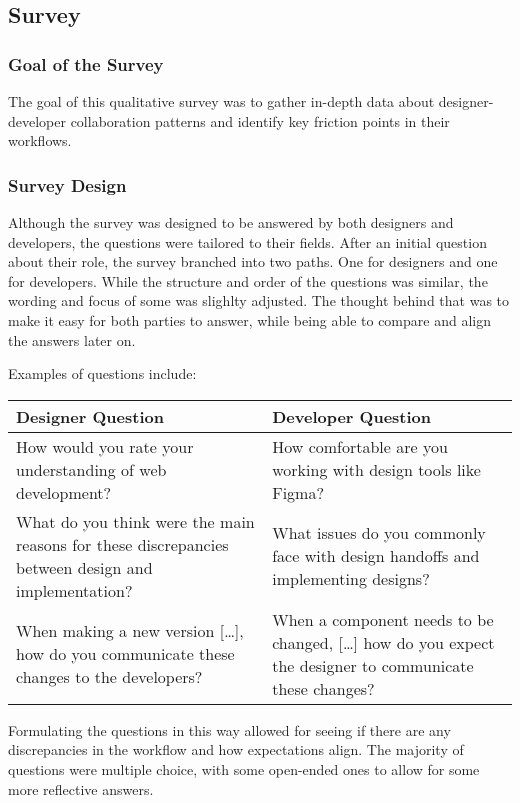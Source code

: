 \newpage
\subsection{Survey}

\subsubsection{Goal of the Survey}
The goal of this qualitative survey was to gather in-depth data about designer-developer
collaboration patterns and identify key friction points in their workflows. 

\subsubsection{Survey Design}
Although the survey was designed to be answered by both designers and developers, the questions were
tailored to their fields. After an initial question about their role, the survey branched into two
paths. One for designers and one for developers. While the structure and order of the questions was
similar, the wording and focus of some was slighlty adjusted. The thought behind that was to make it
easy for both parties to answer, while being able to compare and align the answers later on.

Examples of questions include: %
\begin{center}
    \begin{tabular}{|m{7.5cm}|m{7.5cm}|}
        \hline
        \textbf{Designer Question} & \textbf{Developer Question} \\
        \hline
        How would you rate your understanding of web development? & How comfortable are you working with design tools like Figma?  \\ 
        \hline
        What do you think were the main reasons for these discrepancies between design and implementation? & What issues do you commonly face with design handoffs and implementing designs? \\
        \hline
        When making a new version [\dots], how do you communicate these changes to the developers? & When a component needs to be changed, [\dots] how do you expect the designer to communicate these changes? \\
        \hline
    \end{tabular}
\end{center}

Formulating the questions in this way allowed for seeing if there are any discrepancies in the
workflow and how expectations align. The majority of questions were multiple choice, with some
open-ended ones to allow for some more reflective answers. 

